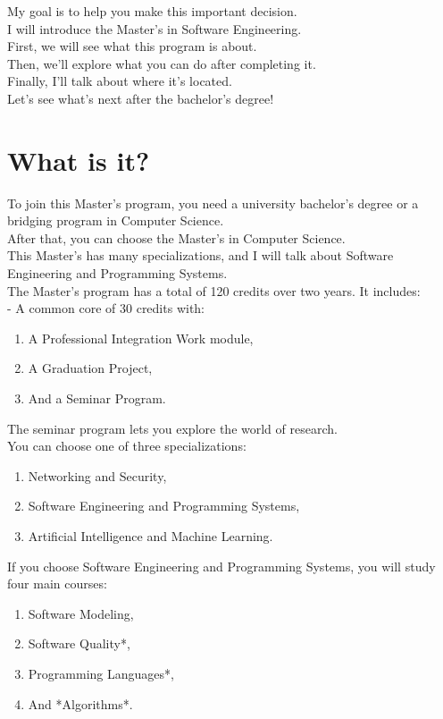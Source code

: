 \documentclass{article}
\begin{document}
My goal is to help you make this important decision.\\

I will introduce the Master’s in Software Engineering.\\  
First, we will see what this program is about.  \\

Then, we’ll explore what you can do after completing it.\\  
Finally, I’ll talk about where it’s located.\\

Let’s see what’s next after the bachelor’s degree!

\section{What is it?}

To join this Master’s program, you need a university bachelor’s degree or 
a bridging program in Computer Science. \\
After that, you can choose the Master’s in Computer Science.\\ 
This Master’s has many specializations, and I will talk about Software Engineering and Programming Systems.\\

The Master’s program has a total of 120 credits over two years. It includes:  \\
- A common core of 30 credits with:
\begin{enumerate} 
   \item A Professional Integration Work module,  
   \item A Graduation Project,  
    \item And a Seminar Program.  
\end{enumerate}
The seminar program lets you explore the world of research. \\
You can choose one of three specializations:  \\
\begin{enumerate} 
   \item Networking and Security,  
    \item Software Engineering and Programming Systems,  
   \item Artificial Intelligence and Machine Learning.  
\end{enumerate}
If you choose Software Engineering and Programming Systems, you will study four main courses: \\ 
\begin{enumerate} 
  \item Software Modeling,  
   \item Software Quality*,  
   \item Programming Languages*,  
    \item And *Algorithms*.  
\end{enumerate}
\end{document}
